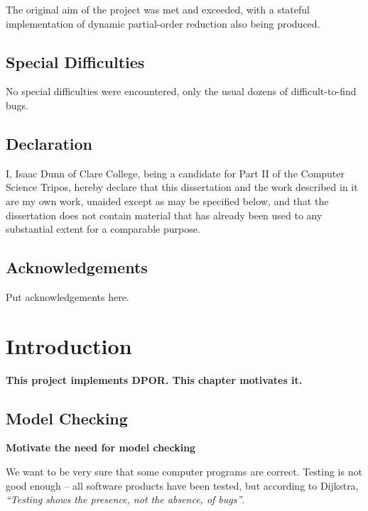 \documentclass[12pt,a4paper,twoside,openright]{report}
\begin{document}
The original aim of the project was met and exceeded, with
a stateful implementation of dynamic partial-order reduction
also being produced.

\section*{Special Difficulties}

No special difficulties were encountered, only the usual dozens of
difficult-to-find bugs.
 
\newpage
\section*{Declaration}

I, Isaac Dunn of Clare College, being a candidate for Part II of the Computer
Science Tripos, hereby declare
that this dissertation and the work described in it are my own work,
unaided except as may be specified below, and that the dissertation
does not contain material that has already been used to any substantial
extent for a comparable purpose.

\bigskip
{}

\bigskip
{}

\tableofcontents

\listoffigures

\newpage
\section*{Acknowledgements}

Put acknowledgements here.


\pagestyle{headings}

\chapter{Introduction}
\textbf{This project implements DPOR. This
	chapter motivates it.}

\section{Model Checking}
\textbf{Motivate the need for model checking}

We want to be very sure that some computer
programs are correct. Testing is not good
enough -- all software products have been
tested, but according to Dijkstra,
\emph{``Testing shows the presence,
	not the absence, of bugs''}.
\end{document}
